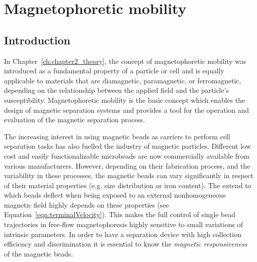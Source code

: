 \chapter{Magnetophoretic mobility}\label{ch:magnetophoretic_mobility}




\section{Introduction}
\label{sec:introductionMagneticParticle}
In Chapter~\ref{ch:chapter2_theory}, the concept of magnetophoretic mobility was introduced as a fundamental property of a particle or cell and is equally applicable to materials that are diamagnetic, paramagnetic, or ferromagnetic, depending on the relationship between the applied field and the particle's susceptibility. Magnetophoretic mobility is the basic concept which enables the design of magnetic separation systems and provides a tool for the operation and evaluation of the magnetic separation process.

The increasing interest in using magnetic beads as carriers to perform cell separation tasks has also fuelled the industry of magnetic particles. Different low cost and easily functionalizable microbeads are now commercially available from various manufacturers. However, depending on their fabrication process, and the variability in these processes, the magnetic beads can vary significantly in respect of their material properties (e.g. size distribution or iron content). The extend to which beads deflect when being exposed to an external nonhomogeneous magnetic field highly depends on these properties (see Equation~\ref{eqn:terminalVelocity}). This makes the full control of single bead trajectories in free-flow magnetophoresis highly sensitive to small variations of intrinsic parameters. In order to have a separation device with high collection efficiency and discrimination it is essential to know the \textit{magnetic responsiveness} of the magnetic beads. 

